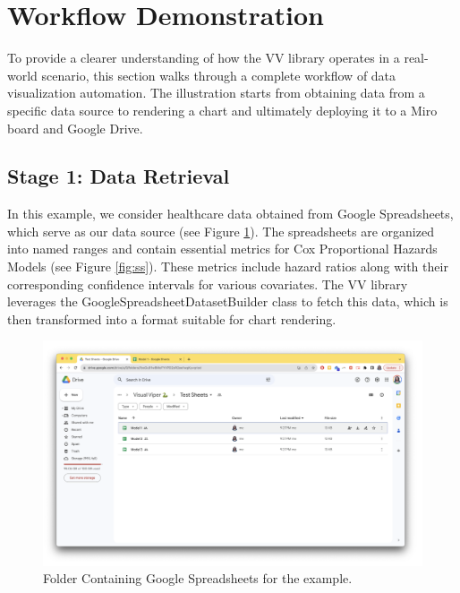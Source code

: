 \section{Workflow Demonstration}\label{workflow-demonstration}

To provide a clearer understanding of how the VV library operates in a
real-world scenario, this section walks through a complete workflow of
data visualization automation. The illustration starts from obtaining
data from a specific data source to rendering a chart and ultimately
deploying it to a Miro board and Google Drive.

\subsection{Stage 1: Data Retrieval}\label{stage-1-data-retrieval}

In this example, we consider healthcare data obtained from Google
Spreadsheets, which serve as our data source (see Figure \ref{fig:sheets_folder}). The
spreadsheets are organized into named ranges and contain essential
metrics for Cox Proportional Hazards Models (see Figure \ref{fig:ss}). These
metrics include hazard ratios along with their corresponding confidence
intervals for various covariates. The VV library leverages the
GoogleSpreadsheetDatasetBuilder class to fetch this data, which is then
transformed into a format suitable for chart rendering.

\begin{figure}[ht]
  \centering
  \includegraphics[width=\textwidth]{media/fig13.png}
  \caption{Folder Containing Google Spreadsheets for the example.}
  \label{fig:sheets_folder}
\end{figure}

